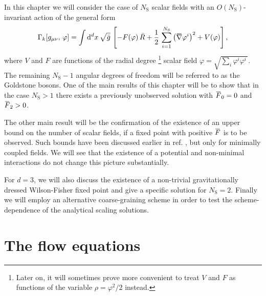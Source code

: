 \documentclass[11pt]{book} %
\newcommand{\overbar}[1]{\mkern 1.5mu\overline{\mkern-1.5mu#1\mkern-1.5mu}\mkern 1.5mu}
\newcommand\gmunu{ g_{\mu\nu} }
\newcommand\NS{ N_{\scriptscriptstyle{\mathrm{S}}} }
\newcommand{\bnabla}{\overbar \nabla}
\newcommand{\bF}{\overbar F}
\numberwithin{equation}{chapter}
\begin{document}
In this chapter we will consider the case of $\NS$ scalar fields with
an $O(\NS)$-invariant action of the general form
\begin{align}
  \Gamma_k [\gmunu, \, \varphi] =
  \int \mathrm d^dx \, \sqrt{\bar g} \,
  \left[ - F(\varphi) \, \bar R + \frac{1}{2} \, \sum_{i=1}^{\NS} \left( \bnabla\varphi^i \right)^2 + V(\varphi)  \right] ,
  \label{action}
\end{align}
where $V$ and $F$ are functions of the radial degree%
\footnote{
Later on, it will sometimes prove more convenient to treat
$V$ and $F$ as functions of the variable $\rho=\varphi^2/2$ instead.
} scalar field
$\varphi=\sqrt{\sum_i \varphi^i \varphi^i \,}$.
The remaining $\NS-1$ angular degrees of freedom will be referred to as the Goldstone bosons.
One of the main results of this chapter will be to show that in the case
$\NS>1$ there exists a previously unobserved solution with $\bF_0=0$ and $\bF_2>0$.

The other main result will be the confirmation
of the existence  of an upper bound on the number of scalar fields,
if a fixed point with positive $\bF$ is to be observed.
Such bounds have been discussed earlier in ref. \cite{Dona:2013qba},
but only for minimally coupled fields.
We will see that the existence of a potential and non-minimal interactions do
not change this picture substantially.

For $d=3$, we will also discuss the existence
of a non-trivial gravitationally dressed Wilson-Fisher fixed point
and give a specific solution for $\NS=2$.
Finally we will employ an alternative coarse-graining scheme
in order to test the scheme-dependence of the analytical scaling solutions.


\section{The flow equations}
\end{document}
